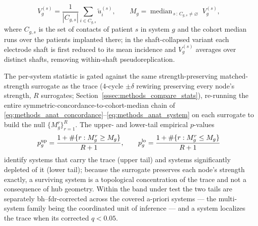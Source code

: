 \begin{equation}
    V_{g}^{(s)} = \frac{1}{|C_{g,s}|}\sum_{i \in C_{g,s}} \tilde{u}^{(s)}_{i}, \qquad M_{g} = \operatorname{median}_{\,s\,:\,C_{g,s} \neq \varnothing}\; V_{g}^{(s)},
    \label{eq:methods_anat_system}
\end{equation}
where \(C_{g,s}\) is the set of contacts of patient \(s\) in system \(g\) and the cohort median runs over the patients implanted there; in the shaft-collapsed variant each electrode shaft is first reduced to its mean incidence and \(V_{g}^{(s)}\) averages over distinct shafts, removing within-shaft pseudoreplication.

The per-system statistic is gated against the same strength-preserving matched-strength surrogate as the trace (\(4\)-cycle \(\pm\delta\) rewiring preserving every node's strength, \(R\) surrogates; Section~\ref{sssec:methods_compare_stats}), re-running the entire symmetric-concordance-to-cohort-median chain of \eqref{eq:methods_anat_concordance}--\eqref{eq:methods_anat_system} on each surrogate to build the null \(\{M_{g}^{r}\}_{r=1}^{R}\). The upper- and lower-tail empirical \(p\)-values
\begin{equation}
    p^{\rm up}_{g} = \frac{1 + \#\{r : M_{g}^{r} \ge M_{g}\}}{R+1}, \qquad p^{\rm lo}_{g} = \frac{1 + \#\{r : M_{g}^{r} \le M_{g}\}}{R+1}
    \label{eq:methods_anat_pval}
\end{equation}
identify systems that carry the trace (upper tail) and systems significantly depleted of it (lower tail); because the surrogate preserves each node's strength exactly, a surviving system is a topological concentration of the trace and not a consequence of hub geometry. Within the band under test the two tails are separately \gls{bh}--\gls{fdr}-corrected across the covered a-priori systems --- the multi-system family being the coordinated unit of inference --- and a system localizes the trace when its corrected \(q < \num{0.05}\).

